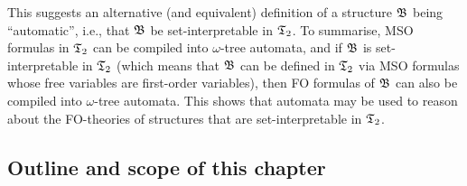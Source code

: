 
This suggests an alternative (and equivalent) definition of a structure $\mathfrak{B}$ being ``automatic'', i.e., that $\mathfrak{B}$ be set-interpretable in $\mathfrak{T}_2$.
To summarise, MSO formulas in $\mathfrak{T}_2$ can be compiled into $\omega$-tree 
automata, and if $\mathfrak{B}$ is set-interpretable in $\mathfrak{T}_2$ (which means that 
$\mathfrak{B}$ can be defined in $\mathfrak{T}_2$ via MSO formulas whose free variables are first-order variables),
then FO formulas of $\mathfrak{B}$ can also be compiled into $\omega$-tree automata. This shows that automata may be used
to reason about the FO-theories of structures that are set-interpretable in $\mathfrak{T}_2$.


\subsection{Outline and scope of this chapter}

% 
% 






